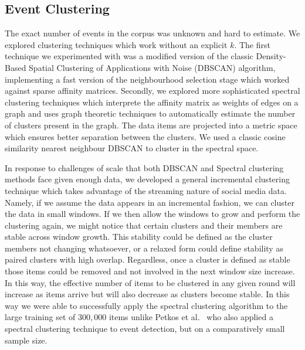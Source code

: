 \documentclass{../acm_proc_article-me11_tweaked}
\begin{document}

\subsection{Event Clustering} %
\label{sub:event_clustering}

The exact number of events in the corpus was unknown and hard to estimate. We explored clustering techniques which work without an explicit $k$. The first technique we experimented with was a modified version of the classic Density-Based Spatial Clustering of Applications with Noise (DBSCAN) algorithm, implementing a fast version of the neighbourhood selection stage which worked against sparse affinity matrices. Secondly, we explored more sophisticated spectral clustering techniques which interprete the affinity matrix as weights of edges on a graph and uses graph theoretic techniques to automatically estimate the number of clusters present in the graph. The data items are projected into a metric space which ensures better separation between the clusters. We used a classic cosine similarity nearest neighbour DBSCAN to cluster in the spectral space. 

In response to challenges of scale that both DBSCAN and Spectral clustering methods face given enough data, we developed a general incremental clustering technique which takes advantage of the streaming nature of social media data. Namely, if we assume the data appears in an incremental fashion, we can cluster the data in small windows. If we then allow the windows to grow and perform the clustering again, we might notice that certain clusters and their members are stable across window growth. This stability could be defined as the cluster members not changing whatsoever, or a relaxed form could define stability as paired clusters with high overlap. Regardless, once a cluster is defined as stable those items could be removed and not involved in the next window size increase. In this way, the effective number of items to be clustered in any given round will increase as items arrive but will also decrease as clusters become stable. In this way we were able to successfully apply the spectral clustering algorithm to the large training set of $300,000$ items unlike Petkos et al.~\cite{Petkos:2012:SED:2324796.2324825} who also applied a spectral clustering technique to event detection, but on a comparatively small sample size.
\end{document}
